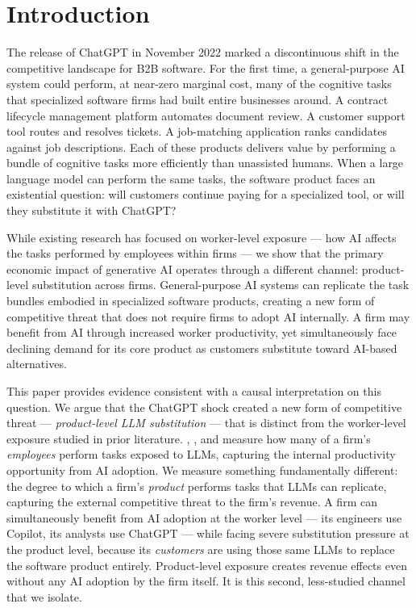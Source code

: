 \documentclass[12pt,a4paper]{article}
\begin{document}
\newpage
\tableofcontents
\newpage

\section{Introduction}

The release of ChatGPT in November 2022 marked a discontinuous shift in the competitive landscape for B2B software. For the first time, a general-purpose AI system could perform, at near-zero marginal cost, many of the cognitive tasks that specialized software firms had built entire businesses around. A contract lifecycle management platform automates document review. A customer support tool routes and resolves tickets. A job-matching application ranks candidates against job descriptions. Each of these products delivers value by performing a bundle of cognitive tasks more efficiently than unassisted humans. When a large language model can perform the same tasks, the software product faces an existential question: will customers continue paying for a specialized tool, or will they substitute it with ChatGPT?

While existing research has focused on worker-level exposure --- how AI affects the tasks performed by employees within firms --- we show that the primary economic impact of generative AI operates through a different channel: product-level substitution across firms. General-purpose AI systems can replicate the task bundles embodied in specialized software products, creating a new form of competitive threat that does not require firms to adopt AI internally. A firm may benefit from AI through increased worker productivity, yet simultaneously face declining demand for its core product as customers substitute toward AI-based alternatives.

This paper provides evidence consistent with a causal interpretation on this question. We argue that the ChatGPT shock created a new form of competitive threat --- \emph{product-level LLM substitution} --- that is distinct from the worker-level exposure studied in prior literature. \citet{eloundou2024}, \citet{labaschin2025}, and \citet{felten2023} measure how many of a firm's \emph{employees} perform tasks exposed to LLMs, capturing the internal productivity opportunity from AI adoption. We measure something fundamentally different: the degree to which a firm's \emph{product} performs tasks that LLMs can replicate, capturing the external competitive threat to the firm's revenue. A firm can simultaneously benefit from AI adoption at the worker level --- its engineers use Copilot, its analysts use ChatGPT --- while facing severe substitution pressure at the product level, because its \emph{customers} are using those same LLMs to replace the software product entirely. Product-level exposure creates revenue effects even without any AI adoption by the firm itself. It is this second, less-studied channel that we isolate.
\end{document}
